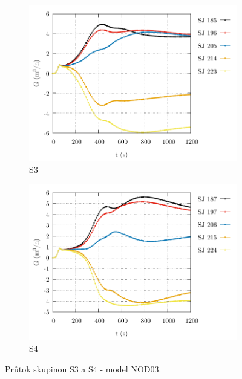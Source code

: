 \begin{figure}
	\centering
	\begin{subfigure}{0.5\textwidth}
		\centering
		\includegraphics[width=\textwidth, trim={0cm 0cm 0cm 0cm}, clip]{./05_TH_model_VR_1/grafy/G_time_nod_03_2.pdf}
				\caption{S3}
		\label{fig:g_time_nod_03_2_prilohy}
	\end{subfigure}%
	\hfill
	\begin{subfigure}{0.5\textwidth}
		\centering
		\includegraphics[width=\textwidth, trim={0cm 0cm 0cm 0cm}, clip]{./05_TH_model_VR_1/grafy/G_time_nod_03_3.pdf}
				\caption{S4}
		\label{fig:g_time_nod_03_3_prilohy}
	\end{subfigure}%
	\caption{Průtok skupinou S3 a S4 - model NOD03.}
\end{figure}
